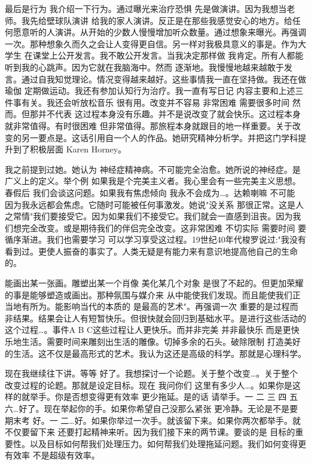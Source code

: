最后是行为 我介绍一下行为。通过曝光来治疗恐惧 先是做演讲。因为我想当老师。我先给壁球队演讲 给我的家人演讲。反正是在那些我感觉安心的地方。给任何愿意听的人演讲。从开始的少数人慢慢增加听众数量。通过想象来曝光。再强调一次。那种想象久而久之会让人变得更自信。另一样对我极具意义的事是。作为大学生 在课堂上公开发言。我不敢公开发言。当我决定那样做 我肯定。所有人都能听到我的心跳声。因为它就在我脑海中。然而 逐渐地。我慢慢地越来越敢于发言。通过自我知觉理论。情况变得越来越好。这些事情我一直在坚持做。我还在做瑜伽 定期做运动。我还有参加认知行为治疗。我一直有写日记 内容主要和上述三件事有关。我还会听放松音乐 很有用。改变并不容易 非常困难 需要很多时间 然而。但那并不代表 这过程本身没有乐趣。并不是说改变了就会快乐。这过程本身就非常值得。有时很困难 但非常值得。那旅程本身就跟目的地一样重要。关于改变的另一要点是。这话引用自一个人的作品。她研究精神分析学。并把这门学科提升到了积极层面 Karen Horney。 

我之前提到过她。她认为 神经症精神病。不可能完全治愈。她所说的神经症。是广义上的定义。举个例 如果我是个完美主义者。我心里会有一些完美主义思想。春假后 我们会谈这问题。如果我有焦虑倾向 我永不会成为…。达赖喇嘛 不可能 因为我永远都会焦虑。它随时可能被任何事激发。她说"没关系 那很正常。这是人之常情"我们要接受它。因为如果我们不接受它。我们就会一直感到沮丧。因为我们想完全改变。或是期待我们的伴侣完全改变。这非常困难 不切实际 需要时间 要循序渐进。我们也需要学习 可以学习享受这过程。19世纪40年代梭罗说过:"我没有看到过。更使人振奋的事实了。人类无疑是有能力来有意识地提高他自己的生命的。 

能画出某一张画。雕塑出某一个肖像 美化某几个对象 是很了不起的。但更加荣耀的事是能够塑造或画出。那种氛围与媒介来 从中能使我们发现。而且能使我们正当地有所为。能影响当代的本质的 是最高的艺术"。再强调一次 重要的是过程而非结果。结果会让人有短暂快乐。但很快就会回归到基础水平。是进行这些活动的这个过程…。事件A B C这些过程让人更快乐。而并非完美 并非最快乐 而是更快乐地生活。需要时间来雕刻出生活的雕像。切掉多余的石头。破除限制 打造美好的生活。这不仅是最高形式的艺术。我认为这还是高级的科学。那就是心理科学。 

现在我继续往下讲。等等 好了。我想探讨一个论题。关于整个改变…。关于整个改变过程的论题。那就是设定目标。现在 我问你们 这里有多少人…。如果你是这样的就举手。你是否想变得更有效率 更少拖延。是的话 请举手。一 二 三 四 五 六…好了。现在举起你的手。如果你希望自己没那么紧张 更冷静。无论是不是要期末考 好。一 二…好。如果你举过一次手。就该留下来。如果你两次都举手。就不仅要留下来 还要打起精神来听。因为我们接下来的两节课。要谈的是 目标的重要性。以及目标如何帮我们处理压力。如何帮我们处理拖延问题。我们如何变得更有效率 不是超级有效率。 

